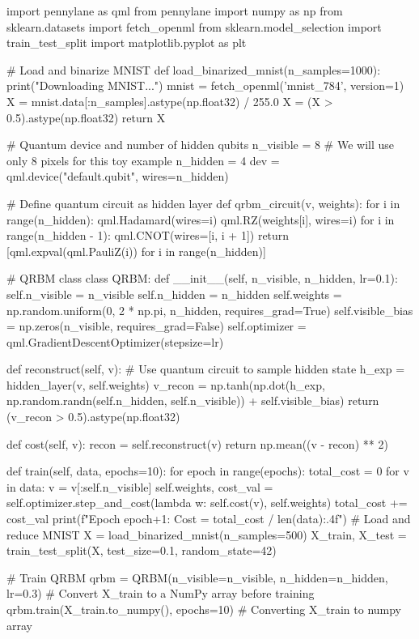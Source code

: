 \documentclass[%
oneside,                 %
final,                   %
10pt]{article}
\begin{document}
\bpycod
import pennylane as qml
from pennylane import numpy as np
from sklearn.datasets import fetch_openml
from sklearn.model_selection import train_test_split
import matplotlib.pyplot as plt

# Load and binarize MNIST
def load_binarized_mnist(n_samples=1000):
    print("Downloading MNIST...")
    mnist = fetch_openml('mnist_784', version=1)
    X = mnist.data[:n_samples].astype(np.float32) / 255.0
    X = (X > 0.5).astype(np.float32)
    return X

# Quantum device and number of hidden qubits
n_visible = 8  # We will use only 8 pixels for this toy example
n_hidden = 4
dev = qml.device("default.qubit", wires=n_hidden)

# Define quantum circuit as hidden layer
def qrbm_circuit(v, weights):
    for i in range(n_hidden):
        qml.Hadamard(wires=i)
        qml.RZ(weights[i], wires=i)
    for i in range(n_hidden - 1):
        qml.CNOT(wires=[i, i + 1])
    return [qml.expval(qml.PauliZ(i)) for i in range(n_hidden)]

# QRBM class
class QRBM:
    def __init__(self, n_visible, n_hidden, lr=0.1):
        self.n_visible = n_visible
        self.n_hidden = n_hidden
        self.weights = np.random.uniform(0, 2 * np.pi, n_hidden, requires_grad=True)
        self.visible_bias = np.zeros(n_visible, requires_grad=False)
        self.optimizer = qml.GradientDescentOptimizer(stepsize=lr)

    def reconstruct(self, v):
        # Use quantum circuit to sample hidden state
        h_exp = hidden_layer(v, self.weights)
        v_recon = np.tanh(np.dot(h_exp, np.random.randn(self.n_hidden, self.n_visible)) + self.visible_bias)
        return (v_recon > 0.5).astype(np.float32)

    def cost(self, v):
        recon = self.reconstruct(v)
        return np.mean((v - recon) ** 2)

    def train(self, data, epochs=10):
        for epoch in range(epochs):
            total_cost = 0
            for v in data:
                v = v[:self.n_visible]
                self.weights, cost_val = self.optimizer.step_and_cost(lambda w: self.cost(v), self.weights)
                total_cost += cost_val
            print(f"Epoch {epoch+1}: Cost = {total_cost / len(data):.4f}")
# Load and reduce MNIST
X = load_binarized_mnist(n_samples=500)
X_train, X_test = train_test_split(X, test_size=0.1, random_state=42)

# Train QRBM
qrbm = QRBM(n_visible=n_visible, n_hidden=n_hidden, lr=0.3)
# Convert X_train to a NumPy array before training
qrbm.train(X_train.to_numpy(), epochs=10) # Converting X_train to numpy array
\end{document}
